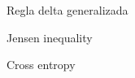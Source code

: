 \documentclass{beamer}
\begin{document}
\begin{frame}{Regla delta generalizada}


\end{frame}




\begin{frame}{Jensen inequality}


\end{frame}

\begin{frame}

\end{frame}



\begin{frame}{Cross entropy}


\end{frame}
\end{document}
